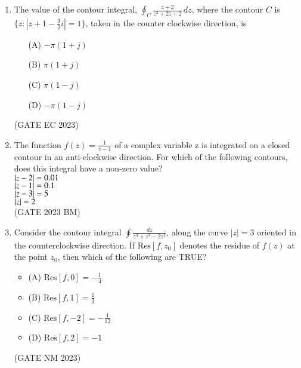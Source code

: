 \begin{enumerate}[label=\thechapter.\arabic*,ref=\thechapter.\theenumi]
\item The value of the contour integral, $\oint_C \frac{z + 2}{z^2 + 2z + 2} \, dz$, where the contour $C$ is $\{ z : |z + 1 - \frac{3}{2}i| = 1 \}$, taken in the counter clockwise direction, is \\

\begin{enumerate}
  \item[(A)] $-\pi(1+j) $
  \item[(B)] $\pi(1+j)$
  \item[(C)] $\pi(1-j) $
  \item[(D)] $-\pi(1-j)$
\end{enumerate}

\hfill{(GATE EC 2023)}\\
\solution

\pagebreak

\item The function $f(z)=\frac{1}{z-1}$ of a complex variable z is integrated on a closed contour in an anti-clockwise direction. For which of the following contours, does this integral have a non-zero value?\\
$\left\vert z-2\right\vert=0.01$\\
$\left\vert z-1\right\vert=0.1$\\
$\left\vert z-3\right\vert=5$\\
$\left\vert z\right\vert=2$\\
\hfill(GATE 2023 BM)\\
\solution

\newpage
\item Consider the contour integral $\oint \frac{dz}{z^4 + z^3 - 2z^2}$, along the curve $|z| = 3$ oriented in the counterclockwise direction. If $\text{Res}[f, z_0]$ denotes the residue of $f(z)$ at the point $z_0$, then which of the following are TRUE? \\
\begin{itemize}
    \item (A) $\text{Res}[f, 0] = -\frac{1}{4}$
    \item (B) $\text{Res}[f, 1] = \frac{1}{3}$
    \item (C) $\text{Res}[f, -2] = -\frac{1}{12}$
    \item (D) $\text{Res}[f, 2] = -1$
\end{itemize}
\hfill{(GATE NM 2023)}\\
\solution

\newpage
\end{enumerate}

